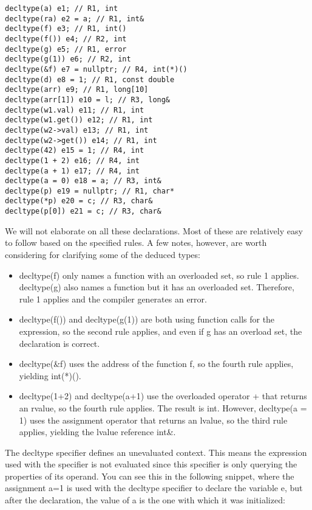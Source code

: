 \begin{lstlisting}[style=styleCXX]
decltype(a) e1; // R1, int
decltype(ra) e2 = a; // R1, int&
decltype(f) e3; // R1, int()
decltype(f()) e4; // R2, int
decltype(g) e5; // R1, error
decltype(g(1)) e6; // R2, int
decltype(&f) e7 = nullptr; // R4, int(*)()
decltype(d) e8 = 1; // R1, const double
decltype(arr) e9; // R1, long[10]
decltype(arr[1]) e10 = l; // R3, long&
decltype(w1.val) e11; // R1, int
decltype(w1.get()) e12; // R1, int
decltype(w2->val) e13; // R1, int
decltype(w2->get()) e14; // R1, int
decltype(42) e15 = 1; // R4, int
decltype(1 + 2) e16; // R4, int
decltype(a + 1) e17; // R4, int
decltype(a = 0) e18 = a; // R3, int&
decltype(p) e19 = nullptr; // R1, char*
decltype(*p) e20 = c; // R3, char&
decltype(p[0]) e21 = c; // R3, char&
\end{lstlisting}

We will not elaborate on all these declarations. Most of these are relatively easy to follow based on the specified rules. A few notes, however, are worth considering for clarifying some of the deduced types:

\begin{itemize}
\item
decltype(f) only names a function with an overloaded set, so rule 1 applies. decltype(g) also names a function but it has an overloaded set. Therefore, rule 1 applies and the compiler generates an error.

\item
decltype(f()) and decltype(g(1)) are both using function calls for the expression, so the second rule applies, and even if g has an overload set, the declaration is correct.

\item
decltype(\&f) uses the address of the function f, so the fourth rule applies, yielding int(*)().

\item
decltype(1+2) and decltype(a+1) use the overloaded operator + that returns an rvalue, so the fourth rule applies. The result is int. However, decltype(a = 1) uses the assignment operator that returns an lvalue, so the third rule applies, yielding the lvalue reference int\&.
\end{itemize}

The decltype specifier defines an unevaluated context. This means the expression used with the specifier is not evaluated since this specifier is only querying the properties of its operand. You can see this in the following snippet, where the assignment a=1 is used with the decltype specifier to declare the variable e, but after the declaration, the value of a is the one with which it was initialized:

